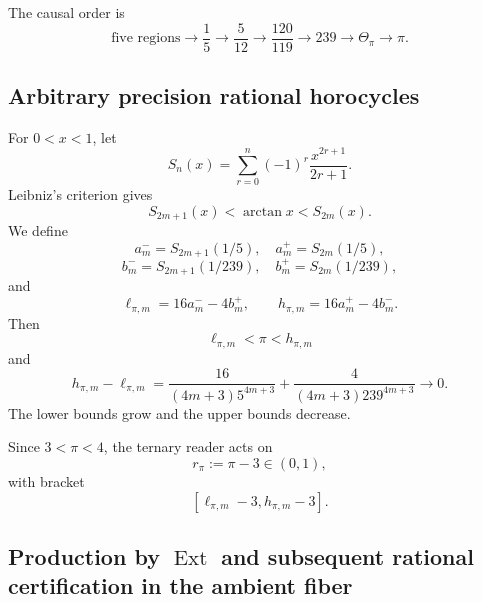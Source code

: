 The causal order is
\[
 \text{five regions}
 \to\frac15
 \to\frac5{12}
 \to\frac{120}{119}
 \to239
 \to\Theta_\pi
 \to\pi.
\]

\subsection{Arbitrary precision rational horocycles}

For \(0<x<1\), let
\[
 S_n(x)=\sum_{r=0}^{n}(-1)^r\frac{x^{2r+1}}{2r+1}.
\]
Leibniz's criterion gives
\[
 S_{2m+1}(x)<\arctan x<S_{2m}(x).
\]
We define
\[
 a_m^-=S_{2m+1}(1/5),\quad a_m^+=S_{2m}(1/5),
\]
\[
 b_m^-=S_{2m+1}(1/239),\quad b_m^+=S_{2m}(1/239),
\]
and
\begin{equation}
 \ell_{\pi,m}=16a_m^- -4b_m^+,
 \qquad
 h_{\pi,m}=16a_m^+ -4b_m^-.
 \label{p12-83-c8-s1:eq:horquilla-pi-autonoma}
\end{equation}
Then
\[
 \ell_{\pi,m}<\pi<h_{\pi,m}
\]
and
\begin{equation}
 h_{\pi,m}-\ell_{\pi,m}
 =
 \frac{16}{(4m+3)5^{4m+3}}
 +\frac{4}{(4m+3)239^{4m+3}}
 \longrightarrow0.
 \label{p12-83-c8-s1:eq:anchura-horquilla-pi}
\end{equation}
The lower bounds grow and the upper bounds decrease.

Since \(3<\pi<4\), the ternary reader acts on
\[
 r_\pi:=\pi-3\in(0,1),
\]
with bracket
\[
 [\ell_{\pi,m}-3,h_{\pi,m}-3].
\]

\subsection{Production by \texorpdfstring{$\operatorname{Ext}$}{Ext} and subsequent rational certification in the ambient fiber}


